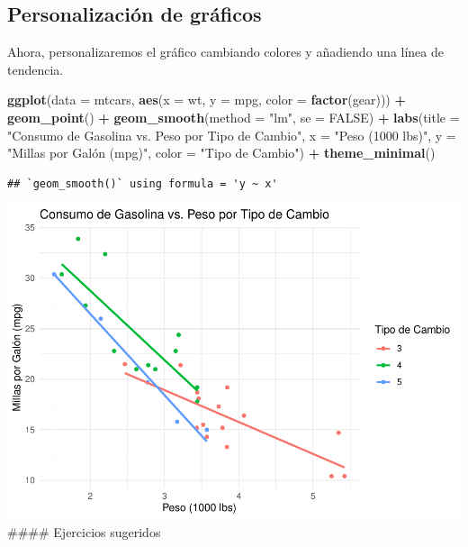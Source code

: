 \documentclass[
]{book}
\newenvironment{Shaded}{\begin{snugshade}}{\end{snugshade}}
\newcommand{\AttributeTok}[1]{\textcolor[rgb]{0.13,0.29,0.53}{#1}}
\newcommand{\ConstantTok}[1]{\textcolor[rgb]{0.56,0.35,0.01}{#1}}
\newcommand{\FunctionTok}[1]{\textcolor[rgb]{0.13,0.29,0.53}{\textbf{#1}}}
\newcommand{\NormalTok}[1]{#1}
\newcommand{\SpecialCharTok}[1]{\textcolor[rgb]{0.81,0.36,0.00}{\textbf{#1}}}
\newcommand{\StringTok}[1]{\textcolor[rgb]{0.31,0.60,0.02}{#1}}
\begin{document}
\subsection{Personalización de gráficos}\label{personalizaciuxf3n-de-gruxe1ficos}

Ahora, personalizaremos el gráfico cambiando colores y añadiendo una línea de tendencia.

\begin{Shaded}
\begin{Highlighting}[]
\FunctionTok{ggplot}\NormalTok{(}\AttributeTok{data =}\NormalTok{ mtcars, }\FunctionTok{aes}\NormalTok{(}\AttributeTok{x =}\NormalTok{ wt, }\AttributeTok{y =}\NormalTok{ mpg, }\AttributeTok{color =} \FunctionTok{factor}\NormalTok{(gear))) }\SpecialCharTok{+} 
  \FunctionTok{geom\_point}\NormalTok{() }\SpecialCharTok{+}
  \FunctionTok{geom\_smooth}\NormalTok{(}\AttributeTok{method =} \StringTok{"lm"}\NormalTok{, }\AttributeTok{se =} \ConstantTok{FALSE}\NormalTok{) }\SpecialCharTok{+}
  \FunctionTok{labs}\NormalTok{(}\AttributeTok{title =} \StringTok{"Consumo de Gasolina vs. Peso por Tipo de Cambio"}\NormalTok{,}
       \AttributeTok{x =} \StringTok{"Peso (1000 lbs)"}\NormalTok{,}
       \AttributeTok{y =} \StringTok{"Millas por Galón (mpg)"}\NormalTok{,}
       \AttributeTok{color =} \StringTok{"Tipo de Cambio"}\NormalTok{) }\SpecialCharTok{+}
  \FunctionTok{theme\_minimal}\NormalTok{()}
\end{Highlighting}
\end{Shaded}

\begin{verbatim}
## `geom_smooth()` using formula = 'y ~ x'
\end{verbatim}

\includegraphics{bookdown-demo_files/figure-latex/unnamed-chunk-175-1.pdf}
\#\#\#\# Ejercicios sugeridos
\end{document}

